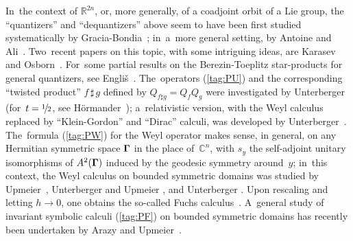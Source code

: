 \documentclass[11pt]{amsart}
\numberwithin{equation}{section}
\theoremstyle{remark}
\newcommand\Omg{{\bigam}}   %
\newcommand\mfr[2]{\raise 0.2\baselineskip\hbox{$\scriptstyle #1$}\!/\hskip
                 -0.1\baselineskip{\scriptstyle #2}}
\newcommand\RR{\mathbb R}
\newcommand{\CC}{\C}
\newcommand{\bigam}{\mbox{\boldmath $\Gamma$}}
\newcommand{\C}{\mathbb C}
\begin{document}
In~the context of $\RR^{2n}$, or, more generally, of a coadjoint orbit of a Lie
group, the ``quantizers'' and ``dequantizers'' above seem to have been first
studied systematically by Gracia-Bondia~\cite{bib:GraBo}; in~a~more general
setting, by Antoine and Ali~\cite{bib:AAli}. Two~recent papers on this topic,
with some intriguing ideas, are Karasev and Osborn~\cite{bib:+KaOsb}. For~some
partial results on the Berezin-Toeplitz star-products for general quantizers,
see Engli\v s~\cite{bib:+Elmp}. The~operators (\ref{tag:PU}) and the
corresponding ``twisted product'' $f\,\sharp\,g$ defined by $Q_{f\sharp g}=
Q_f Q_g$ were investigated by
Unterberger~\cite{bib:Unta} (for~$t=\mfr12$, see H\"ormander~\cite{bib:HormW});
a~relativistic version, with the Weyl calculus replaced by ``Klein-Gordon'' and
``Dirac'' calculi, was developed by Unterberger~\cite{bib:Untr}. The~formula
(\ref{tag:PW}) for the Weyl operator makes sense, in general, on any Hermitian
symmetric space $\Omg$ in the place of~$\CC^n$, with $s_y$ the self-adjoint
unitary isomorphisms of $A^2(\Omg)$ induced by the geodesic symmetry
around~$y$; in~this context, the Weyl calculus on bounded symmetric domains was
studied by Upmeier~\cite{bib:UpmW}, Unterberger and Upmeier \cite{bib:UntU},
and Unterberger \cite{bib:Untw} \cite{bib:UntESI}. Upon rescaling and letting
$h\to0$, one obtains the so-called Fuchs calculus~\cite{bib:UntF}. A~general
study of invariant symbolic calculi (\ref{tag:PF}) on bounded symmetric domains
has recently been undertaken by Arazy and Upmeier~\cite{bib:ArUp}.
\end{document}

